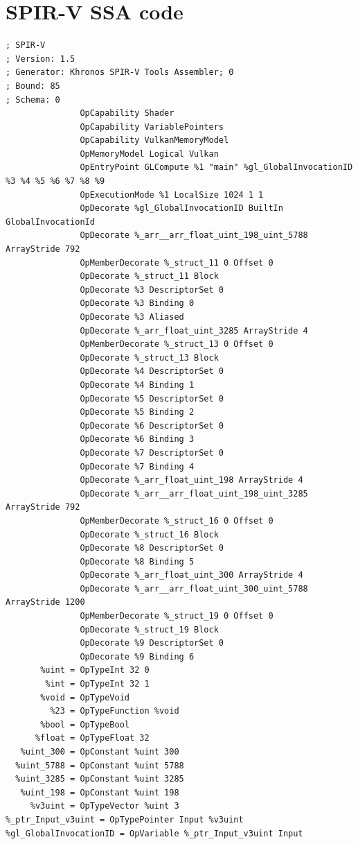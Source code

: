\documentclass{IEEEtran}
\begin{document}
\section{SPIR-V SSA code}
\begin{lstlisting}
; SPIR-V
; Version: 1.5
; Generator: Khronos SPIR-V Tools Assembler; 0
; Bound: 85
; Schema: 0
               OpCapability Shader
               OpCapability VariablePointers
               OpCapability VulkanMemoryModel
               OpMemoryModel Logical Vulkan
               OpEntryPoint GLCompute %1 "main" %gl_GlobalInvocationID %3 %4 %5 %6 %7 %8 %9
               OpExecutionMode %1 LocalSize 1024 1 1
               OpDecorate %gl_GlobalInvocationID BuiltIn GlobalInvocationId
               OpDecorate %_arr__arr_float_uint_198_uint_5788 ArrayStride 792
               OpMemberDecorate %_struct_11 0 Offset 0
               OpDecorate %_struct_11 Block
               OpDecorate %3 DescriptorSet 0
               OpDecorate %3 Binding 0
               OpDecorate %3 Aliased
               OpDecorate %_arr_float_uint_3285 ArrayStride 4
               OpMemberDecorate %_struct_13 0 Offset 0
               OpDecorate %_struct_13 Block
               OpDecorate %4 DescriptorSet 0
               OpDecorate %4 Binding 1
               OpDecorate %5 DescriptorSet 0
               OpDecorate %5 Binding 2
               OpDecorate %6 DescriptorSet 0
               OpDecorate %6 Binding 3
               OpDecorate %7 DescriptorSet 0
               OpDecorate %7 Binding 4
               OpDecorate %_arr_float_uint_198 ArrayStride 4
               OpDecorate %_arr__arr_float_uint_198_uint_3285 ArrayStride 792
               OpMemberDecorate %_struct_16 0 Offset 0
               OpDecorate %_struct_16 Block
               OpDecorate %8 DescriptorSet 0
               OpDecorate %8 Binding 5
               OpDecorate %_arr_float_uint_300 ArrayStride 4
               OpDecorate %_arr__arr_float_uint_300_uint_5788 ArrayStride 1200
               OpMemberDecorate %_struct_19 0 Offset 0
               OpDecorate %_struct_19 Block
               OpDecorate %9 DescriptorSet 0
               OpDecorate %9 Binding 6
       %uint = OpTypeInt 32 0
        %int = OpTypeInt 32 1
       %void = OpTypeVoid
         %23 = OpTypeFunction %void
       %bool = OpTypeBool
      %float = OpTypeFloat 32
   %uint_300 = OpConstant %uint 300
  %uint_5788 = OpConstant %uint 5788
  %uint_3285 = OpConstant %uint 3285
   %uint_198 = OpConstant %uint 198
     %v3uint = OpTypeVector %uint 3
%_ptr_Input_v3uint = OpTypePointer Input %v3uint
%gl_GlobalInvocationID = OpVariable %_ptr_Input_v3uint Input

\end{lstlisting}
\end{document}
